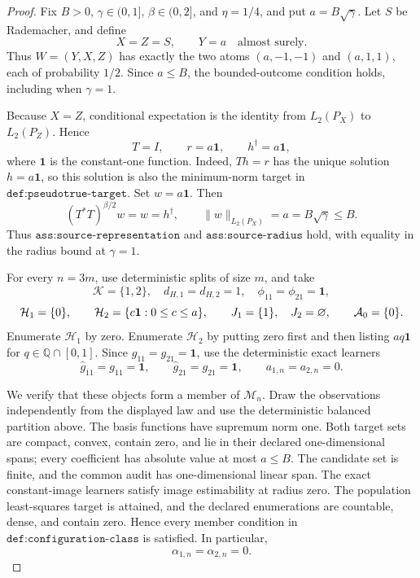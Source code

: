 \documentclass{article}
\begin{document}
\begin{proof}
Fix \(B>0\), \(\gamma\in(0,1]\), \(\beta\in(0,2]\), and \(\eta=1/4\), and put \(a=B\sqrt{\gamma}\). Let \(S\) be Rademacher, and define
\[
 X=Z=S,\qquad Y=a\quad\text{almost surely}.
\]
Thus \(W=(Y,X,Z)\) has exactly the two atoms \((a,-1,-1)\) and \((a,1,1)\), each of probability \(1/2\). Since \(a\le B\), the bounded-outcome condition holds, including when \(\gamma=1\).

Because \(X=Z\), conditional expectation is the identity from \(L_2(P_X)\) to \(L_2(P_Z)\). Hence
\[
 T=I,\qquad r=a\mathbf 1,\qquad h^\dagger=a\mathbf 1,
\]
where \(\mathbf 1\) is the constant-one function. Indeed, \(Th=r\) has the unique solution \(h=a\mathbf 1\), so this solution is also the minimum-norm target in \(\texttt{def:pseudotrue-target}\). Set \(w=a\mathbf 1\). Then
\[
 (T^*T)^{\beta/2}w=w=h^\dagger,
 \qquad
 \|w\|_{L_2(P_X)}=a=B\sqrt{\gamma}\le B.
\]
Thus \(\texttt{ass:source-representation}\) and \(\texttt{ass:source-radius}\) hold, with equality in the radius bound at \(\gamma=1\).

For every \(n=3m\), use deterministic splits of size \(m\), and take
\[
 \mathcal K=\{1,2\},\quad d_{H,1}=d_{H,2}=1,\quad
 \phi_{11}=\phi_{21}=\mathbf 1,
\]
\[
\makebox[\linewidth][c]{\resizebox{0.98\linewidth}{!}{\(\displaystyle \mathcal H_1=\{0\},\qquad
 \mathcal H_2=\{c\mathbf 1:0\le c\le a\},
 \qquad J_1=\{1\},\quad J_2=\varnothing,
 \qquad \mathcal A_0=\{0\}.\)}}
\]
Enumerate \(\mathcal H_1\) by zero. Enumerate \(\mathcal H_2\) by putting zero first and then listing \(a q\mathbf 1\) for \(q\in\mathbb Q\cap[0,1]\). Since \(g_{11}=g_{21}=\mathbf 1\), use the deterministic exact learners
\[
 \widehat g_{11}=g_{11}=\mathbf 1,
 \qquad
 \widehat g_{21}=g_{21}=\mathbf 1,
 \qquad
 a_{1,n}=a_{2,n}=0.
\]

We verify that these objects form a member of \(\mathcal M_n\). Draw the observations independently from the displayed law and use the deterministic balanced partition above. The basis functions have supremum norm one. Both target sets are compact, convex, contain zero, and lie in their declared one-dimensional spans; every coefficient has absolute value at most \(a\le B\). The candidate set is finite, and the common audit has one-dimensional linear span. The exact constant-image learners satisfy image estimability at radius zero. The population least-squares target is attained, and the declared enumerations are countable, dense, and contain zero. Hence every member condition in \(\texttt{def:configuration-class}\) is satisfied. In particular,
\[
 \alpha_{1,n}=\alpha_{2,n}=0.
\]


\end{proof}
\end{document}
